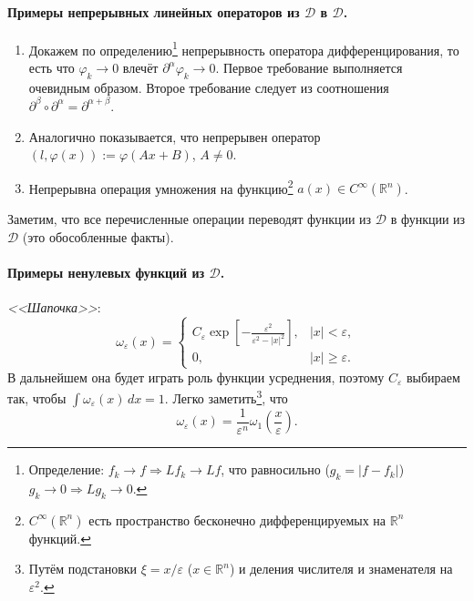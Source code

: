 \paragraph{Примеры непрерывных линейных операторов из $ \mathcal D $ в $ \mathcal D $.} 
\begin{enumerate}
	\item Докажем по определению\footnote{Определение: $ f_k \to f
		\Rightarrow Lf_k \to Lf $, что равносильно ($ g_k = |f - f_k| $) $ g_k \to 0
		\Rightarrow Lg_k \to 0 $.} непрерывность оператора дифференцирования, то есть
	что $ \varphi_k \to 0 $ влечёт $
	\partial^\alpha\varphi_k \to 0 $. Первое требование выполняется очевидным
	образом. Второе требование следует из соотношения $ \partial^\beta \circ
	\partial^\alpha = \partial^{\alpha + \beta} $.
	\item Аналогично показывается, что непрерывен оператор $ (l, \varphi(x)) :=
	\varphi(Ax + B) $, $ A \neq 0 $.
	\item  Непрерывна операция умножения на функцию\footnote{$C^\infty(\mathbb
		R^n)$ есть
		пространство бесконечно дифференцируемых на $ \mathbb R^n $ функций.} $
	a(x)\in C^\infty(\mathbb R^n) $.
\end{enumerate}
Заметим, что все перечисленные операции переводят функции из $ \mathcal D $ в
функции из $ \mathcal D $ (это обособленные факты).

\paragraph{Примеры ненулевых функций из $ \mathcal D $.}
\emph{<<Шапочка>>}: 
\[
\omega_\varepsilon(x) = \begin{cases}
	C_\varepsilon\exp \left[ - \frac{\varepsilon^2}{\varepsilon^2 - |x|^2}
	\right], & |x| < \varepsilon,\\
	0, & |x| \geqslant \varepsilon.
\end{cases}
\]
В дальнейшем она будет играть роль функции усреднения, поэтому $ C_\varepsilon $
выбираем так, чтобы $ \int \omega_\varepsilon(x)\,dx=1 $. Легко
заметить\footnote{Путём подстановки $ \xi = x/\varepsilon $ ($ x \in \mathbb R^n
	$) и деления числителя
	и знаменателя на $ \varepsilon^2 $.}, что 
\[
\omega_\varepsilon(x) = \frac{1}{\varepsilon^n}\omega_1 \left(
\frac{x}{\varepsilon} \right).
\]

